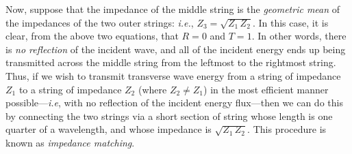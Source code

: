 Now, suppose that the impedance of the middle string is the {\em geometric mean}\/ of
the imped\-ances of the two outer strings: {\em i.e.}, $Z_3=\sqrt{Z_1\,Z_2}$.
In this case, it is clear, from the above two equations, that $R=0$ and $T=1$. In
other words, there is {\em no reflection}\/ of the incident wave, and all of the
incident energy ends up being transmitted across the middle string from the leftmost to the
rightmost string. Thus, if we wish to transmit transverse wave energy from a string
of impedance $Z_1$ to a string of impedance  $Z_2$ (where $Z_2\neq Z_1$) in the most efficient manner
possible---{\em i.e}, with no reflection of the incident energy flux---then we can
do this by connecting the two strings via a short section of string whose length is
one quarter of a wavelength, and whose impedance is $\sqrt{Z_1\,Z_2}$. 
This procedure is known as {\em impedance matching}. 

